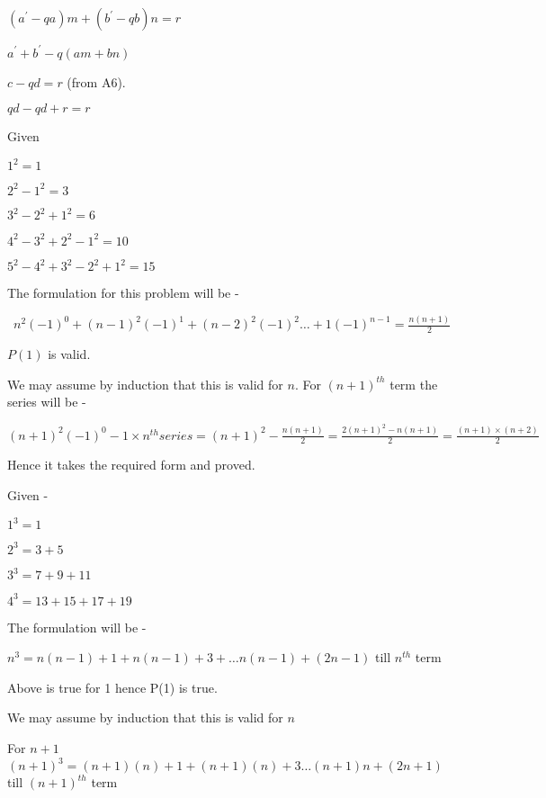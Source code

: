 \documentclass[12pt]{article}
\begin{document}
\begin{enumerate}
\begin{item}
    $ (a^{\prime} - qa)m + (b^\prime - qb)n = r$

    $ a^{\prime} + b^{\prime} - q(am + bn)$

    $ c - qd =  r $ (from A6).

    $ qd - qd + r = r$

  \end{item}

  \begin{item}
    Given
    \begin{center}
      $1^2 = 1$

      $ 2^2 - 1^2 = 3 $

      $ 3^2 - 2^2 + 1^2 = 6 $

      $ 4^2 - 3^2 + 2^2 - 1^2 = 10 $

      $ 5^2 - 4^2 + 3^2 - 2^2 + 1^2 = 15 $
      \end{center}
      The formulation for this problem will be -

      \mbox{ $ n^2(-1)^{0} + (n-1)^2(-1)^1 + (n-2)^2(-1)^2 \ldots + 1(-1)^{n-1} = \frac{n(n+1)}{2}$}

      $P(1)$ is valid.

      We may assume by induction that this is valid for $n$.
      For $(n+1)^{th}$ term the series will be -

      $ {(n+1)^2(-1)^0} -1 \times {n^{th} series}  =  (n+1)^2 - \frac{n(n+1)}{2} = \frac{2(n+1)^2 - n(n+1)}{2} = \frac{(n+1) \times (n+2)}{2} $

      Hence it takes the required form and proved.
  \end{item}

  \begin{item}
    Given -
    \begin{center}
      $1^3 = 1$

      $2^3 = 3 + 5 $

      $3^3 = 7 + 9 + 11 $

      $4^3 = 13 + 15 + 17 + 19 $
 
    \end{center}
     The formulation will be -

      $n^3 = n(n-1) + 1 + n(n-1) + 3 + \ldots n(n-1) + (2n-1) $ till $n^{th}$ term
      
      Above is true for 1 hence P(1) is true.

      We may assume by induction that this is valid for $n$

      For $n+1$
      $(n+1)^3 = (n+1)(n) + 1 + (n+1)(n) + 3 \ldots (n+1)n + (2n+1)$ till $(n+1)^{th}$ term
      

\end{item}
\end{enumerate}
\end{document}
